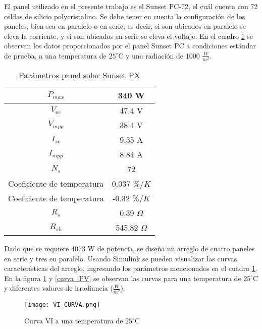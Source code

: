 \documentclass[10pt,twocolumn]{article}
\begin{document}
El panel utilizado en el presente trabajo es el Sunset PC-72, el cuál cuenta con 72 celdas de silicio polycristalino. Se debe tener en cuenta la configuración de los paneles, bien sea en paralelo o en serie; es decir, si son ubicados en paralelo se eleva la corriente, y si son ubicados en serie se eleva el voltaje. En el cuadro \ref{datos_panel} se observan los datos proporcionados por el panel Sunset PC a condiciones estándar de prueba, a una temperatura de $25^{\circ}$C y una radiación de 1000 $\frac{W}{m^2}$.

\begin{table}[h]
    \begin{center}
   
        \begin{tabular}{ | c | c | }
           \hline $ P_{max} $ & 340 W \\ \hline
            $V_{oc} $ & 47.4 V \\ \hline
            $ V_{mpp}$ & 38.4 V \\ \hline
            $ I_{sc} $ & 9.35 A  \\ \hline
           $I_{mpp} $ & 8.84 A  \\ \hline
            $ N_{s} $ & 72  \\ \hline
            Coeficiente de temperatura  & 0.037 $\% /K$  \\ \hline
            Coeficiente de temperatura  & -0.32 $\% /K$  \\ \hline
            $ R_{s}$ & 0.39 $\Omega $  \\ \hline
             $R_{sh}$ & 545.82 $\Omega $  \\ \hline
\end{tabular}
\caption{Parámetros panel solar Sunset PX \cite{sunset}}
\label{datos_panel}
\end{center}
\end{table}

Dado que se requiere 4073 W de potencia, se diseña un arreglo de cuatro paneles en serie y tres en paralelo. Usando Simulink se pueden visualizar las curvas características del arreglo, ingresando los parámetros mencionados en el cuadro \ref{datos_panel}. En la figura \ref{curva_VI} y \ref{curva_PV} se observan las curvas para una temperatura de $25^{\circ}$C y diferentes valores de irradiancia ($\frac{W}{m^2}$).

\begin{figure}[h!]
    \centering
    \texttt{[image: VI\_CURVA.png]}
    \caption{Curva VI a una temperatura de $25^{\circ}$C}
    \label{curva_VI}
\end{figure}
\end{document}
